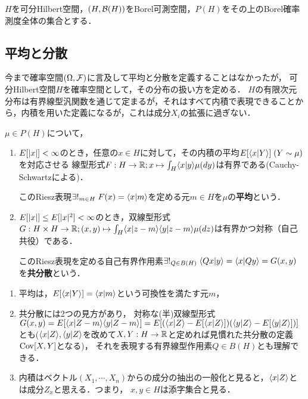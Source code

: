 \documentclass[uplatex,dvipdfmx]{jsreport}
\begin{document}
\begin{notation}
    $H$を可分Hilbert空間，$(H,\mathcal{B}(H))$をBorel可測空間，$P(H)$をその上のBorel確率測度全体の集合とする．
\end{notation}

\subsection{平均と分散}

\begin{tcolorbox}[colframe=ForestGreen, colback=ForestGreen!10!white,breakable,colbacktitle=ForestGreen!40!white,coltitle=black,fonttitle=\bfseries\sffamily,
title=]
    今まで確率空間$(\Omega,\mathcal{F})$に言及して平均と分散を定義することはなかったが，
    可分Hilbert空間$H$を確率空間として，その分布の扱い方を定める．
    $H$の有限次元分布は有界線型汎関数を通じて定まるが，それはすべて内積で表現できることから，内積を用いた定義になるが，これは成分$X_i$の拡張に過ぎない．
\end{tcolorbox}

\begin{definition}
    $\mu\in P(H)$について，
    \begin{enumerate}
        \item $E[\lvert x\rvert]<\infty$のとき，任意の$x\in H$に対して，その内積の平均$E[\langle x|Y\rangle]\;(Y\sim\mu)$を対応させる
        線型形式$F:H\to\mathbb{R};x\mapsto\int_H\langle x|y\rangle\mu(dy)$は有界である(Cauchy-Schwartzによる)．
        
        このRiesz表現$\exists!_{m\in H}\;F(x)=\langle x|m\rangle$を定める元$m\in H$を$\mu$の\textbf{平均}という．
        \item $E[\lvert x\rvert]\le E[\lvert x\rvert^2]<\infty$のとき，双線型形式$G:H\times H\to\mathbb{R};(x,y)\mapsto\int_H\langle x|z-m\rangle\langle y|z-m\rangle\mu(dz)$は有界かつ対称（自己共役）である．
        
        このRiesz表現を定める自己有界作用素$\exists!_{Q\in B(H)}\;\langle Qx|y\rangle=\langle x|Qy\rangle=G(x,y)$を\textbf{共分散}という．
    \end{enumerate}
\end{definition}
\begin{remarks}\mbox{}
    \begin{enumerate}
        \item 平均は，$E[\langle x|Y\rangle]=\langle x|m\rangle$という可換性を満たす元$m$，
        \item 共分散には2つの見方があり，
        対称な(半)双線型形式$G(x,y)=E[\langle x|Z-m\rangle\langle y|Z-m\rangle]=E[(\langle x|Z\rangle-E[\langle x|Z\rangle])(\langle y|Z\rangle-E[\langle y|Z\rangle])]$とも($\langle x|Z\rangle,\langle y|Z\rangle$を改めて$X,Y:H\to\mathbb{R}$と定めれば見慣れた共分散の定義$\mathrm{Cov}[X,Y]$となる)，
        それを表現する有界線型作用素$Q\in B(H)$とも理解できる．
        \item 内積はベクトル$(X_1,\cdots,X_n)$からの成分の抽出の一般化と見ると，$\langle x|Z\rangle$とは成分$Z_x$と思える．つまり，
        $x,y\in H$は添字集合と見る．
    \end{enumerate}
\end{remarks}
\end{document}

